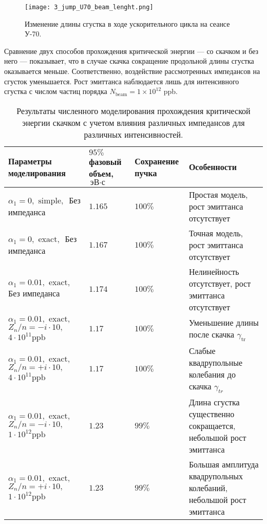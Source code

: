 \begin{figure}
   \centering
   \texttt{[image: 3\_jump\_U70\_beam\_lenght.png]}
   \caption{Изменение длины сгустка в ходе ускорительного цикла на сеансе У-70.}
   \label{fig:3_jump_U70_beam_lenght}
\end{figure}

\par Сравнение двух способов прохождения критической энергии — со скачком и без него — показывает, что в случае скачка сокращение продольной длины сгустка оказывается меньше. Соответственно, воздействие рассмотренных импедансов на сгусток уменьшается. Рост эмиттанса наблюдается лишь для интенсивного сгустка с числом частиц порядка $N_{\textrm{beam}}=1\times10^{12}$ ppb.

\begin{table}
\begin{center}
\begin{tabular}{| m{4cm} | M{2.5cm} | M{2.5cm} | m{6.6cm} |}
\hline 
Параметры моделирования & $95 \%$ фазовый объем, $\text{эВ}\cdot\text{с}$ & Сохранение пучка & Особенности \\
\hline
$ \alpha_1=0, \text { simple, } $ Без импеданса
 & $1.165$ & $100\%$ &
Простая модель, рост эмиттанса отсутствует \\
\hline
$ \alpha_1=0, \text { exact, } $ Без импеданса
 & $1.167$ & $100\%$ & 
Точная модель, рост эмиттанса отсутствует  \\
\hline
$ \alpha_1=0.01, \text { exact, }$ Без импеданса
 & $1.174$ & $100\%$ & Нелинейность отсутствует, рост эмиттанса отсутствует \\
\hline 
$ \alpha_1=0.01, \text { exact, } $
$ Z_n / n=-i \cdot 10, \quad $
$ 4 \cdot 10^{11} \mathrm{ppb} $
 & $1.17$ & $100\%$ & Уменьшение длины после скачка $\gamma_{\text {tr }}$ \\
\hline 
$ \alpha_1=0.01, \text { exact, } $
$ Z_n / n=+i \cdot 10, \quad $
$ 4 \cdot 10^{11} \mathrm{ppb} $
 & $1.17$ & $100\%$ & Слабые квадрупольные колебания до скачка $\gamma_{t r}$ \\
\hline
$ \alpha_1=0.01, \text { exact, } $
$ Z_n / n=-i \cdot 10, \quad$
$ 1 \cdot 10^{12} \mathrm{ppb} $
 & $1.23$ & $99\%$ & Длина сгустка существенно сокращается, небольшой рост эмиттанса \\
\hline
$ \alpha_1=0.01, \text { exact, } $
$ Z_n / n=+i \cdot 10, \quad$
$ 1 \cdot 10^{12} \mathrm{ppb} $
 & $1.23$ & $99\%$ & Большая амплитуда квадрупольных колебаний, небольшой рост эмиттанса \\
\hline
\end{tabular}
\end{center}
\caption{Результаты численного моделирования прохождения критической энергии скачком с учетом влияния различных импедансов для различных интенсивностей.}
\label{tab:u-70_model}
\end{table}

